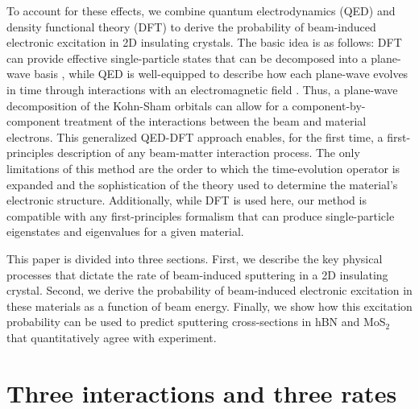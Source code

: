 \documentclass{article}
\begin{document}
To account for these effects, we combine quantum electrodynamics (QED) and
density functional theory (DFT) to derive the probability of beam-induced
electronic excitation in 2D insulating crystals.
The basic idea is as follows: DFT can provide effective single-particle states
that can be decomposed into a plane-wave basis \cite{Hohenberg1964, Kohn1965,
Kresse1996a}, while QED is well-equipped to describe how each plane-wave
evolves in time through interactions with an electromagnetic field
\cite{Lourenco-Martins2021, Peskin1995, Lancaster2014}.
Thus, a plane-wave decomposition of the Kohn-Sham orbitals can allow for a
component-by-component treatment of the interactions between the beam and
material electrons.
This generalized QED-DFT approach enables, for the first time, a
first-principles description of any beam-matter interaction process.
The only limitations of this method are the order to which the time-evolution
operator is expanded and the sophistication of the theory used to determine the
material's electronic structure.
Additionally, while DFT is used here, our method is compatible with any
first-principles formalism that can produce single-particle eigenstates and
eigenvalues for a given material.

This paper is divided into three sections.
First, we describe the key physical processes that dictate the rate of
beam-induced sputtering in a 2D insulating crystal.
Second, we derive the probability of beam-induced electronic excitation in
these materials as a function of beam energy.
Finally, we show how this excitation probability can be used to predict
sputtering cross-sections in hBN and MoS$_2$ that quantitatively agree with
experiment.


\section{Three interactions and three rates}
\label{sec:bigPicture}
\end{document}
